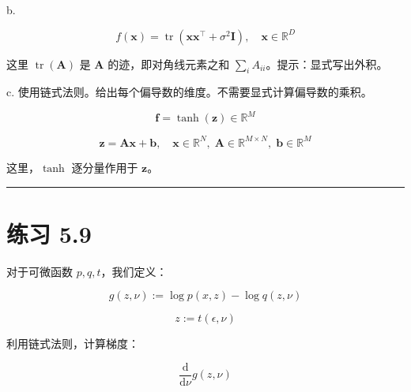 b.

\begin{equation*}
f(\boldsymbol{x}) = \operatorname{tr}(\boldsymbol{x} \boldsymbol{x}^\top + \sigma^2 \boldsymbol{I}), \quad \boldsymbol{x} \in \mathbb{R}^D
\end{equation*}

这里 $ \operatorname{tr}(\boldsymbol{A}) $ 是 $ \boldsymbol{A} $ 的迹，即对角线元素之和 $ \sum_i A_{ii} $。提示：显式写出外积。

c. 使用链式法则。给出每个偏导数的维度。不需要显式计算偏导数的乘积。

\begin{equation*}
\boldsymbol{f} = \tanh(\boldsymbol{z}) \in \mathbb{R}^M
\end{equation*}

\begin{equation*}
\boldsymbol{z} = \boldsymbol{A} \boldsymbol{x} + \boldsymbol{b}, \quad \boldsymbol{x} \in \mathbb{R}^N, \; \boldsymbol{A} \in \mathbb{R}^{M \times N}, \; \boldsymbol{b} \in \mathbb{R}^M
\end{equation*}

这里，$ \tanh $ 逐分量作用于 $ \boldsymbol{z} $。

\medskip\hrule\medskip

\section*{练习 5.9}

对于可微函数 $ p, q, t $，我们定义：

\begin{equation*}
g(z, \nu) := \log p(x, z) - \log q(z, \nu)
\end{equation*}

\begin{equation*}
z := t(\epsilon, \nu)
\end{equation*}

利用链式法则，计算梯度：

\begin{equation*}
\frac{\mathrm{d}}{\mathrm{d}\nu} g(z, \nu)
\end{equation*}
